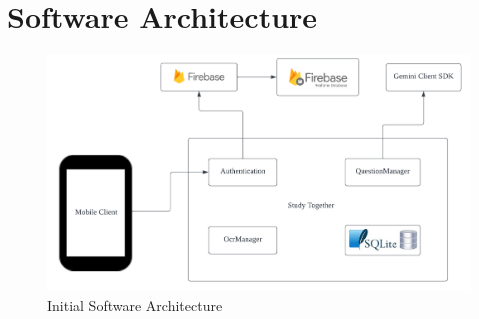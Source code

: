 \chapter{Software Architecture}\label{software_architecture}

\begin{figure}[h] %
       \centering
       \includegraphics[scale = .80]{Figures/StudyTogether_Architecture.png}
       \caption{\footnotesize Initial Software Architecture}
       \label{fig2}
\end{figure}

